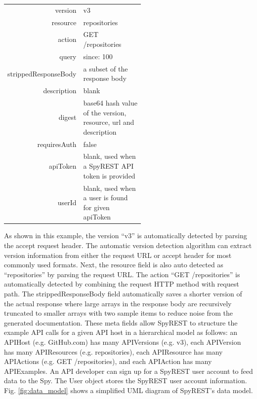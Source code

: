 \documentclass[conference]{IEEEtran}
\begin{document}
\footnotesize
\begin{tabular}{r p{0.55\linewidth}}
  version & v3 \\
  resource & repositories \\
  action & GET /repositories \\
  query & since: 100 \\
  strippedResponseBody & a subset of the response body \\
  description & blank \\
  digest & base64 hash value of the version, resource, url and description \\
  requiresAuth & false \\
  apiToken & blank, used when a SpyREST API token is provided \\
  userId & blank, used when a user is found for given apiToken \\
\end{tabular}
\normalsize


As shown in this example, the version ``v3'' is automatically detected by parsing the accept request header. The automatic version detection algorithm can extract version information from either the request URL or accept header for most commonly used formats. Next, the resource field is also auto detected as ``repositories'' by parsing the request URL. The action ``GET /repositories'' is automatically detected by combining the request HTTP method with request path. The strippedResponseBody field automatically saves a shorter version of the actual response where large arrays in the response body are recursively truncated to smaller arrays with two sample items to reduce noise from the generated documentation. These meta fields allow SpyREST to structure the example API calls for a given API host in a hierarchical model as follows: an APIHost (e.g. GitHub.com) has many APIVersions (e.g. v3), each APIVersion has many APIResources (e.g. repositories), each APIResource has many APIActions (e.g. GET /repositories), and each APIAction has many APIExamples. An API developer can sign up for a SpyREST user account to feed data to the Spy. The User object stores the SpyREST user account information. Fig. \ref{fig:data_model} shows a simplified UML diagram of SpyREST's data model.
\end{document}
